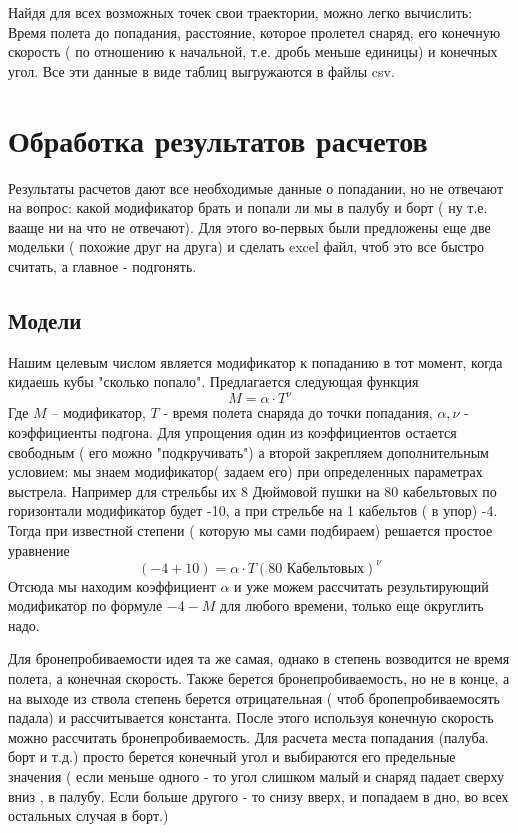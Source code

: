 \documentclass{article}
\begin{document}
Найдя для всех возможных точек свои траектории, можно легко вычислить: Время полета до попадания, расстояние, которое пролетел снаряд, его конечную скорость ( по отношению к начальной, т.е. дробь меньше единицы) и конечных угол. Все эти данные в виде таблиц выгружаются в файлы csv.

\section{ Обработка результатов расчетов}

Результаты расчетов дают все необходимые данные о попадании, но не отвечают на вопрос: какой модификатор брать и попали ли мы в палубу и борт ( ну т.е. вааще ни на что не отвечают). Для этого во-первых были предложены еще две модельки ( похожие друг на друга) и сделать excel файл, чтоб это все быстро считать, а главное - подгонять.

\subsection{Модели}

Нашим целевым числом является модификатор к попаданию в тот момент, когда кидаешь кубы "сколько попало". Предлагается следующая функция
\begin{equation}
	M = \alpha \cdot T^\nu
\end{equation}
Где $M$ -- модификатор, $T$ - время полета снаряда до точки попадания, $\alpha,\nu$ - коэффициенты подгона. Для упрощения один из коэффициентов остается свободным ( его можно "подкручивать") а второй закрепляем дополнительным условием: мы знаем модификатор( задаем его) при определенных параметрах выстрела. Например для стрельбы их 8 Дюймовой пушки на 80 кабельтовых по горизонтали модификатор будет -10, а  при стрельбе на 1 кабельтов ( в упор) -4. Тогда при известной степени ( которую мы сами подбираем) решается простое уравнение
\begin{equation}
	(-4+10)= \alpha \cdot T(\text{80 Кабельтовых})^\nu
\end{equation}
Отсюда мы находим коэффициент $\alpha$ и уже можем рассчитать результирующий модификатор по формуле $-4-M$ для любого времени, только еще округлить надо.

Для бронепробиваемости идея та же самая, однако в степень возводится не время полета, а конечная скорость. Также берется бронепробиваемость, но не в конце, а на выходе из ствола степень берется отрицательная ( чтоб бропепробиваемосять падала) и рассчитывается константа. После этого используя конечную скорость можно рассчитать бронепробиваемость. Для расчета места попадания (палуба. борт и т.д.) просто берется конечный угол и выбираются его предельные значения ( если меньше  одного - то угол слишком малый и снаряд падает сверху вниз , в палубу. Если больше другого - то снизу вверх, и попадаем в дно, во всех остальных случая в борт.)
\end{document}
